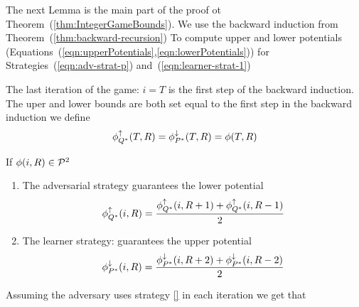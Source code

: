 \documentclass{article}[12pt]
\begin{document}
The next Lemma is the main part of the proof ot
Theorem~(\ref{thm:IntegerGameBounds}). We use the backward induction
from Theorem~(\ref{thm:backward-recursion}) To compute upper and lower
potentials (Equations~(\ref{eqn:upperPotentials},\ref{eqn:lowerPotentials})) for
Strategies~(\ref{eqn:adv-strat-p}) and~(\ref{eqn:learner-strat-1})

The last iteration of the game: $i=T$ is the first step of the
backward induction. The uper and lower bounds are both set equal to
the first step in the backward induction we define
$$  \phi_{Q^*}^{\uparrow}(T,R) = \phi_{P^*}^{\downarrow}(T,R) = \phi(T,R) $$

\begin{lemma} \label{lemma:first-order-bound}
  If $\phi(i,R) \in {\cal P}^{2}$
  \begin{enumerate}
    \item The adversarial strategy
    guarantees the lower potential
 \begin{equation} \label{eqn:backward-iteration-lower}
   \phi_{Q^*}^{\uparrow}(i, R) = \frac{\phi_{Q^*}^{\uparrow}(i,R+1) + \phi_{Q^*}^{\uparrow}(i,R-1)}{2}
 \end{equation}
   
    \item The learner strategy:
      guarantees the upper potential 
      \begin{equation} \label{eqn:backward-iteration-upper-recursion}
        \phi_{P^*}^{\downarrow}(i, R) = \frac{\phi_{P^*}^{\downarrow}(i,R+2) + \phi_{P^*}^{\downarrow}(i,R-2)}{2}
      \end{equation}
    \end{enumerate}
    Assuming the adversary uses strategy \ref{} in
    each iteration we get that 
\end{lemma}
\end{document}
